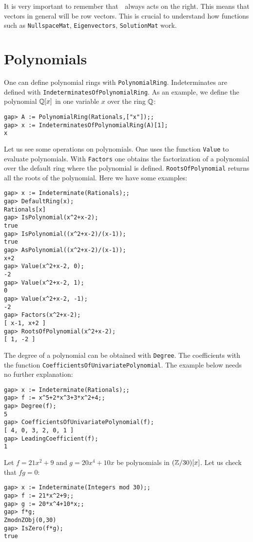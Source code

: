 \begin{remark}
It is very important to remember that~\GAP~always acts on the right. This means
that vectors in general will be row vectors. This is crucial 
to understand how functions such as  
\lstinline{NullspaceMat}, \lstinline{Eigenvectors},  
\lstinline{SolutionMat}
work. 
\end{remark}



\section{Polynomials}

One can define polynomial rings with \lstinline{PolynomialRing}. Indeterminates
are defined with \lstinline{IndeterminatesOfPolynomialRing}. As an example, we
define the polynomial $\mathbb{Q}[x]$ in one variable $x$ over the ring $\mathbb{Q}$:
\begin{lstlisting}
gap> A := PolynomialRing(Rationals,["x"]);;
gap> x := IndeterminatesOfPolynomialRing(A)[1];
x
\end{lstlisting}

Let us see some operations on polynomials.  One uses the function
\lstinline{Value} to evaluate polynomials. With \lstinline{Factors} one obtains
the factorization of a polynomial over the default ring where the polynomial is
defined. \lstinline{RootsOfPolynomial} returns all the roots of the polynomial.
Here we have some examples:
\begin{lstlisting}
gap> x := Indeterminate(Rationals);;
gap> DefaultRing(x);
Rationals[x]
gap> IsPolynomial(x^2+x-2);
true
gap> IsPolynomial((x^2+x-2)/(x-1));
true
gap> AsPolynomial((x^2+x-2)/(x-1));
x+2
gap> Value(x^2+x-2, 0);
-2
gap> Value(x^2+x-2, 1);
0
gap> Value(x^2+x-2, -1);
-2
gap> Factors(x^2+x-2);
[ x-1, x+2 ]
gap> RootsOfPolynomial(x^2+x-2);
[ 1, -2 ]
\end{lstlisting}

The degree of a polynomial can be obtained with \lstinline{Degree}.  The
coefficients with the function \lstinline{CoefficientsOfUnivariatePolynomial}.
The example below needs no further explanation:
\begin{lstlisting}
gap> x := Indeterminate(Rationals);;
gap> f := x^5+2*x^3+3*x^2+4;;
gap> Degree(f);
5
gap> CoefficientsOfUnivariatePolynomial(f);
[ 4, 0, 3, 2, 0, 1 ]
gap> LeadingCoefficient(f);
1
\end{lstlisting}



\begin{example}
	Let $f=21x^2+9$ and $g=20x^4+10x$ be polynomials in $(\mathbb{Z}/30)[x]$. Let us
	check that $fg=0$:
\begin{lstlisting}
gap> x := Indeterminate(Integers mod 30);;
gap> f := 21*x^2+9;;
gap> g := 20*x^4+10*x;;
gap> f*g;
ZmodnZObj(0,30)
gap> IsZero(f*g);
true
\end{lstlisting}
\end{example}


